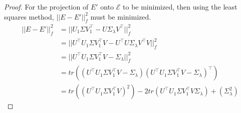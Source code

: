 \documentclass{article}
\begin{document}
\begin{proof}
    For the projection of $E'$ onto $\mathcal{E}$ to be minimized, then using the least squares method, $||E-E'||_f^2$ must be minimized.
    \begin{align*}
        ||E-E'||_f^2 &= ||U_1\Sigma V_1^\top - U\Sigma_\lambda V^\top||_f^2\\
        &= ||U^\top U_1\Sigma V_1^\top V - U^\top U\Sigma_\lambda V^\top V||_f^2\\
        &= ||U^\top U_1\Sigma V_1^\top V - \Sigma_\lambda ||_f^2\\
        &= tr((U^\top U_1\Sigma V_1^\top V - \Sigma_\lambda)(U^\top U_1\Sigma V_1^\top V - \Sigma_\lambda)^\top)\\
        &= tr((U^\top U_1\Sigma V_1^\top V)^2) -2tr(U^\top U_1\Sigma V_1^\top V\Sigma_\lambda)+(\Sigma_\lambda^2)     
    \end{align*}


\end{proof}
\end{document}
